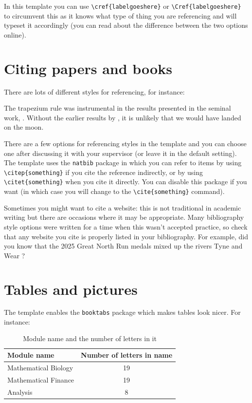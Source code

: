\documentclass[12pt,a4paper,openany,twoside]{book}
\begin{document}
In this template you can use \verb|\cref{labelgoeshere}| or \verb|\Cref{labelgoeshere}| to circumvent this as it knows what type of thing you are referencing and will typeset it accordingly (you can read about the difference between the two options online). 



\section{Citing papers and books}\label{sec:citing}
There are lots of different styles for referencing, for instance:

The trapezium rule \citep{tai1994mathematical} was instrumental in the results presented in the seminal work, \citet{maruyama2013galois}. Without the earlier results by \citeauthor{tai1994mathematical}, it is unlikely that we would have landed on the moon.

There are a few options for referencing styles in the template and you can choose one after discussing it with your supervisor (or leave it in the default setting). The template uses the \verb|natbib| package in which you can refer to items by using \verb|\citep{something}| if you cite the reference indirectly, or by using \verb|\citet{something}| when you cite it directly. You can disable this package if you want (in which case you will change to the \verb|\cite{something}| command). 

\label{page:overflow_help}Sometimes you might want to cite a website: this is not traditional in academic writing but there are occasions where it may be appropriate. Many bibliography style options were written for a time when this wasn't accepted practice, so check that any website you cite is properly listed in your bibliography. For example, did you know that the 2025 Great North Run medals mixed up the rivers Tyne and Wear \citep{bbcnews}?


\section{Tables and pictures}
The template enables the \texttt{booktabs} package which makes tables look nicer. For instance:
\begin{table}[h!]
	\begin{center}
	\begin{tabular}{lc}
		\toprule
		Module name & Number of letters in name \\
		\midrule
		Mathematical Biology & 19 \\
		Mathematical Finance & 19 \\
		Analysis & 8 \\
		\bottomrule
	\end{tabular}
		\caption[Length of module names]{Module name and the number of letters in it}
	\end{center}
\end{table}
\end{document}
